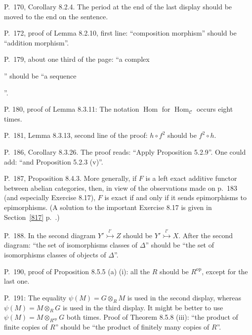 \documentclass[12pt]{article}
\theoremstyle{remark}
\theoremstyle{definition}
\newcommand{\C}{\mathcal C}
\DeclareMathOperator{\Hom}{Hom}%
\DeclareMathOperator{\op}{op}
\begin{document}
\noindent P.~170, Corollary 8.2.4. The period at the end of the last display should be moved to the end on the sentence.


\noindent P.~172, proof of Lemma 8.2.10, first line: ``composition morphism'' should be ``addition morphism''. 


\noindent P.~179, about one third of the page: ``a complex 
'' 
should be ``a sequence 
''.

\noindent P. 180, proof of Lemma 8.3.11: The notation $\Hom$ for $\Hom_\C$ occurs eight times. 

\noindent P.~181, Lemma 8.3.13, second line of the proof: $h\circ f^2$ should be $f^2\circ h$. 

\noindent P.~186, Corollary 8.3.26. The proof reads: ``Apply Proposition 5.2.9''. One could add: ``and Proposition 5.2.3 (v)''. 

\noindent P.~187, Proposition 8.4.3. More generally, if $F$ is a left exact additive functor between abelian categories, then, in view of the observations made on p.~183 (and especially Exercise 8.17), $F$ is exact if and only if it sends epimorphisms to epimorphisms. (A solution to the important Exercise 8.17 is given in Section~\ref{817} p.~\pageref{817}.) 

\noindent P.~188. In the second diagram $Y'\overset{l'}{\rightarrowtail}Z$ should be $Y'\overset{l'}{\rightarrowtail}X$. After the second diagram: ``the set of isomorphisms classes of $\Delta$'' should be ``the set of isomorphisms classes of objects of $\Delta$''.

\noindent P.~190, proof of Proposition 8.5.5 (a) (i): all the $R$ should be $R^{\op}$, except for the last one.

\noindent P.~191: The equality $\psi(M)=G\otimes_RM$ is used in the second display, whereas $\psi(M)=M\otimes_RG$ is used in the third display. It might be better to use $\psi(M)=M\otimes_{R^{\op}}G$ both times. Proof of Theorem 8.5.8 (iii): ``the product of finite copies of $R$'' should be ``the product of finitely many copies of $R$''.
\end{document}
